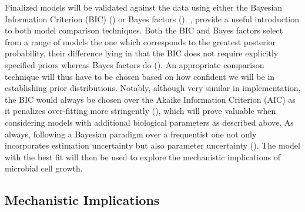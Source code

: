 \documentclass{bioinfo}
\begin{document}
Finalized models will be validated against the data using either the Bayesian Information Criterion (BIC) (\citealp{Schwarz78}) or Bayes factors (\citealp{Kass95}). \citealp{Christensen11}, provide a useful introduction to both model comparison techniques. Both the BIC and Bayes factors select from a range of models the one which corresponds to the greatest posterior probability, their difference lying in that the BIC does not require explicitly specified priors whereas Bayes factors do (\citealp{Bollen12}). An appropriate comparison technique will thus have to be chosen based on how confident we will be in establishing prior distributions. Notably, although very similar in implementation, the BIC would always be chosen over the Akaike Information Criterion (AIC) as it penalizes over-fitting more stringently (\citealp{Burnham02}), which will prove valuable when considering models with additional biological parameters as described above. As always, following a Bayesian paradigm over a frequentist one not only incorporates estimation uncertainty but also parameter uncertainty (\citealp{Christensen11}). The model with the best fit will then be used to explore the mechanistic implications of microbial cell growth. 


\subsection{Mechanistic Implications}
\end{document}
